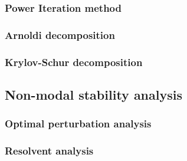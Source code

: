     \subsubsection{Power Iteration method}

    \subsubsection{Arnoldi decomposition}

    \subsubsection{Krylov-Schur decomposition}





  \subsection{Non-modal stability analysis}

    \subsubsection{Optimal perturbation analysis}

    \subsubsection{Resolvent analysis}
